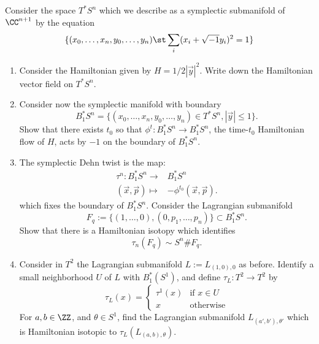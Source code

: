
 
 
Consider the space $T^*S^n$ which we describe as a symplectic 
submanifold of $\CC^{n+1}$ by the equation
\[\{(x_0, \ldots, x_n,y_0, \ldots, y_n) \st \sum_{i} (x_i+\sqrt{-1} 
y_i)^2=1 \}\]
\begin{enumerate}
    \item Consider the Hamiltonian given by $H=1/2|\vec y|^2$. Write 
down the Hamiltonian vector field on $T^*S^n$.
    \item Consider now the symplectic manifold with boundary 
    \[B^*_1S^n=\{(x_0, \ldots, x_n,y_0, \ldots, y_n) \in T^*S^n, |\vec 
y|\leq 1\}.\]
    Show that there exists $t_0$ so that $\phi^{t}: B^*_1S^n\to B^*_1 S^n$, the time-$t_0$ Hamiltonian flow of $H$, acts by  $-1$ on the boundary of $B^*_1S^n$. 
    \item The symplectic Dehn twist is the map: 
    \begin{align*}
        \tau^n: B^*_1 S^n\to& B^*_1 S^n\\
            (\vec x, \vec p) \mapsto& -\phi^{t_0}(\vec x, \vec p).
    \end{align*}
    which fixes the boundary of $B^*_1 S^n$.
    Consider the Lagrangian submanifold  
    \[F_q:=\{(1, \ldots, 0), (0, p_1, \ldots, p_n)\}\subset B^*_1S^n.\]
    Show that there is a Hamiltonian isotopy which identifies
    \[\tau_n(F_q)\sim S^n\# F_q.\]
    \item Consider in $T^2$ the Lagrangian submanifold $L:=L_{(1, 0),0}$ as before. Identify a small neighborhood $U$ of $L$ with $B^*_1(S^1)$, and define $\tau_L: T^2\to T^2$ by 
    \[\tau_L(x)=\left\{\begin{array}{cc} \tau^1(x) &\text{if $x\in U$}\\
        x &\text{otherwise}\end{array}\right.\]
    For $a, b\in \ZZ$, and $\theta\in S^1$, find the Lagrangian submanifold $L_{(a', b'), \theta'}$ which is Hamiltonian isotopic to  $\tau_L(L_{(a, b), \theta})$.
\end{enumerate}

 
